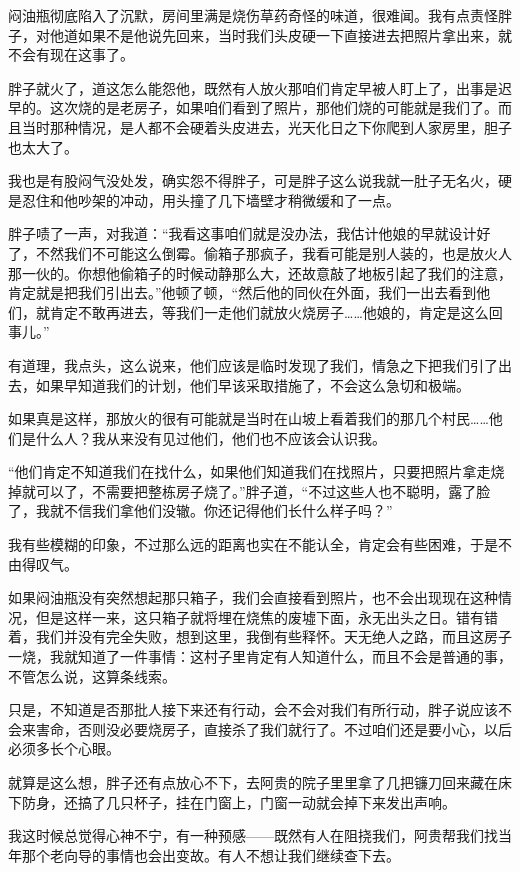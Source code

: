 闷油瓶彻底陷入了沉默，房间里满是烧伤草药奇怪的味道，很难闻。我有点责怪胖子，对他道如果不是他说先回来，当时我们头皮硬一下直接进去把照片拿出来，就不会有现在这事了。

胖子就火了，道这怎么能怨他，既然有人放火那咱们肯定早被人盯上了，出事是迟早的。这次烧的是老房子，如果咱们看到了照片，那他们烧的可能就是我们了。而且当时那种情况，是人都不会硬着头皮进去，光天化日之下你爬到人家房里，胆子也太大了。

我也是有股闷气没处发，确实怨不得胖子，可是胖子这么说我就一肚子无名火，硬是忍住和他吵架的冲动，用头撞了几下墙壁才稍微缓和了一点。

胖子啧了一声，对我道：“我看这事咱们就是没办法，我估计他娘的早就设计好了，不然我们不可能这么倒霉。偷箱子那疯子，我看可能是别人装的，也是放火人那一伙的。你想他偷箱子的时候动静那么大，还故意敲了地板引起了我们的注意，肯定就是把我们引出去。”他顿了顿，“然后他的同伙在外面，我们一出去看到他们，就肯定不敢再进去，等我们一走他们就放火烧房子……他娘的，肯定是这么回事儿。”

有道理，我点头，这么说来，他们应该是临时发现了我们，情急之下把我们引了出去，如果早知道我们的计划，他们早该采取措施了，不会这么急切和极端。

如果真是这样，那放火的很有可能就是当时在山坡上看着我们的那几个村民……他们是什么人？我从来没有见过他们，他们也不应该会认识我。

“他们肯定不知道我们在找什么，如果他们知道我们在找照片，只要把照片拿走烧掉就可以了，不需要把整栋房子烧了。”胖子道，“不过这些人也不聪明，露了脸了，我就不信我们拿他们没辙。你还记得他们长什么样子吗？”

我有些模糊的印象，不过那么远的距离也实在不能认全，肯定会有些困难，于是不由得叹气。

如果闷油瓶没有突然想起那只箱子，我们会直接看到照片，也不会出现现在这种情况，但是这样一来，这只箱子就将埋在烧焦的废墟下面，永无出头之日。错有错着，我们并没有完全失败，想到这里，我倒有些释怀。天无绝人之路，而且这房子一烧，我就知道了一件事情：这村子里肯定有人知道什么，而且不会是普通的事，不管怎么说，这算条线索。

只是，不知道是否那批人接下来还有行动，会不会对我们有所行动，胖子说应该不会来害命，否则没必要烧房子，直接杀了我们就行了。不过咱们还是要小心，以后必须多长个心眼。

就算是这么想，胖子还有点放心不下，去阿贵的院子里里拿了几把镰刀回来藏在床下防身，还搞了几只杯子，挂在门窗上，门窗一动就会掉下来发出声响。

我这时候总觉得心神不宁，有一种预感——既然有人在阻挠我们，阿贵帮我们找当年那个老向导的事情也会出变故。有人不想让我们继续查下去。

